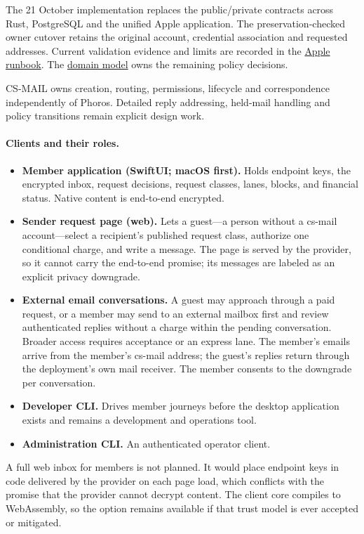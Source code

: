 \documentclass[11pt]{article}
\begin{document}
The 21 October implementation replaces the public/private contracts across Rust,
PostgreSQL and the unified Apple application. The preservation-checked owner
cutover retains the original account, credential association and requested
addresses. Current validation evidence and limits are recorded in the
\href{apps/cs-mail-apple/README.md}{Apple runbook}. The
\href{DOMAIN_MODEL.md}{domain model} owns the remaining policy decisions.

CS-MAIL owns creation, routing, permissions, lifecycle and correspondence independently
of Phoros. Detailed reply addressing, held-mail handling and policy transitions
remain explicit design work.

\paragraph{Clients and their roles.}
\begin{itemize}
    \item \textbf{Member application (SwiftUI; macOS first).} Holds endpoint keys, the
    encrypted inbox, request decisions, request classes, lanes, blocks, and
    financial status. Native content is end-to-end encrypted.
    \item \textbf{Sender request page (web).} Lets a guest---a person without a
    cs-mail account---select a recipient's published request class, authorize
    one conditional charge, and write a message. The page is served by the
    provider, so it cannot carry the end-to-end promise; its messages are
    labeled as an explicit privacy downgrade.
    \item \textbf{External email conversations.} A guest may approach through a
    paid request, or a member may send to an external mailbox first and review
    authenticated replies without a charge within the pending conversation.
    Broader access requires acceptance or an express lane. The member's emails arrive from the member's cs-mail
    address; the guest's replies return through the deployment's own mail
    receiver. The member consents to the downgrade per conversation.
    \item \textbf{Developer CLI.} Drives member journeys before the desktop
    application exists and remains a development and operations tool.
    \item \textbf{Administration CLI.} An authenticated operator client.
\end{itemize}

A full web inbox for members is not planned. It would place endpoint keys in code
delivered by the provider on each page load, which conflicts with the promise that
the provider cannot decrypt content. The client core compiles to WebAssembly, so
the option remains available if that trust model is ever accepted or mitigated.
\end{document}
